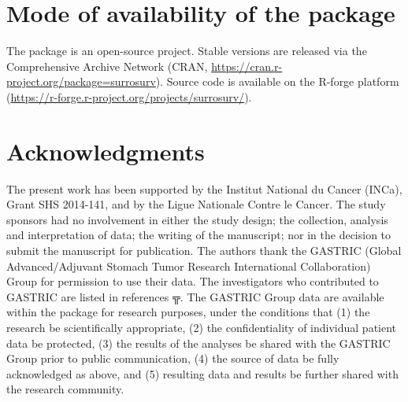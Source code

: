 \documentclass[]{scrartcl}\usepackage[]{graphicx}\usepackage[]{color}
\begin{document}
{{%
\section{Mode of availability of the  package}
The  package is an open-source project.
Stable versions are released via the Comprehensive  Archive Network
    (CRAN, \url{https://cran.r-project.org/package=surrosurv}).
Source code is available on the R-forge platform
  (\url{https://r-forge.r-project.org/projects/surrosurv/}).

\section*{Acknowledgments}
The present work has been supported
  by the Institut National du Cancer (INCa),
  Grant SHS 2014-141, and by the Ligue Nationale Contre le Cancer.
The study sponsors had no involvement in either the study design;
  the collection, analysis and interpretation of data; 
  the writing of the manuscript; 
  nor in the decision to submit the manuscript for publication. 
The authors thank the GASTRIC
  (Global Advanced/Adjuvant Stomach Tumor Research International Collaboration)
  Group for permission to use their data.
The investigators who contributed to GASTRIC are listed in references
  \cite{Oba2013, Paoletti2013, GASTRIC10, GASTRIC13}╦.
The GASTRIC Group data are available within the  package
  for research purposes, under the conditions that
  (1) the research be scientifically appropriate,
  (2) the confidentiality of individual patient data be protected,
  (3) the results of the analyses be shared with the GASTRIC Group prior to public communication,
  (4) the source of data be fully acknowledged as above, and
  (5) resulting data and results be further shared with the research community.

}}
\end{document}
